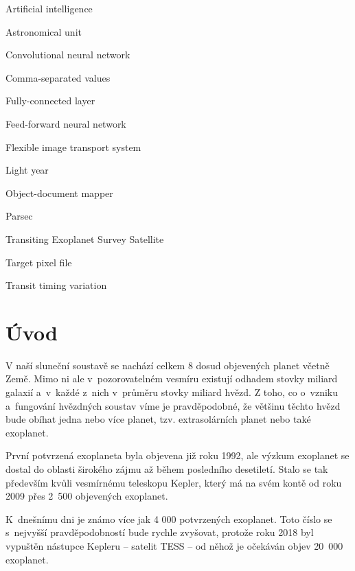 \documentclass[a4paper,12pt]{article}
\begin{document}
\deskpage
\mainpage
\assignment
\statement
\acknowledgment
\annotationcs	
\annotationen
\content
\imglist
\tablelist
\codelist
\formulalist
\shortlist

\begin{description}[font=\mdseries,leftmargin=6em,labelwidth=!,]
\item[AI]       Artificial intelligence
\item[au]		Astronomical unit
\item[CNN]      Convolutional neural network
\item[csv]      Comma-separated values
\item[FC]       Fully-connected layer
\item[FFNN]     Feed-forward neural network
\item[fits]     Flexible image transport system
\item[ly]		Light year
\item[ODM]      Object-document mapper
\item[pc]       Parsec
\item[TESS]     Transiting Exoplanet Survey Satellite
\item[TPF]      Target pixel file
\item[TTV]		Transit timing variation
\end{description}

\clearpage\pagestyle{plain}
\section*{Úvod}
\label{uvod}

V naší sluneční soustavě se nachází celkem 8 dosud objevených planet včetně Země. Mimo ni ale v~pozorovatelném vesmíru existují odhadem stovky miliard galaxií a~v~každé z~nich v~průměru stovky miliard hvězd. Z toho, co o~vzniku a~fungování hvězdných soustav víme je pravděpodobné, že většinu těchto hvězd bude obíhat jedna nebo více planet, tzv. extrasolárních planet nebo také exoplanet.~\cite{exoplanets}

První potvrzená exoplaneta byla objevena již roku 1992, ale výzkum exoplanet se dostal do oblasti širokého zájmu až během posledního desetiletí. Stalo se tak především kvůli vesmírnému teleskopu Kepler, který má na svém kontě od roku 2009 přes 2~500 objevených exoplanet.~\cite{kepler80,nasadata}

K~dnešnímu dni je známo více jak 4 000 potvrzených exoplanet. Toto číslo se s~nejvyšší pravděpodobností bude rychle zvyšovat, protože roku 2018 byl vypuštěn nástupce Kepleru -- satelit TESS -- od něhož je očekáván objev 20~000 exoplanet.~\cite{tess}
\end{document}
